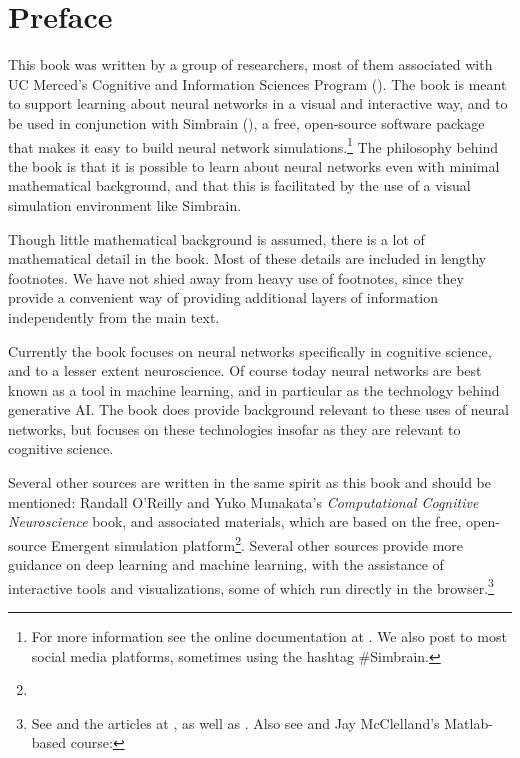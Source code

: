 \chapter*{Preface}\label{ch_preface}

This book was written by a group of researchers, most of them associated with UC Merced's Cognitive and Information Sciences Program (). The book is meant to support learning about neural networks in a visual and interactive way, and to be used in conjunction with Simbrain (), a free, open-source software package that makes it easy to build neural network simulations.\footnote{For more information see the online documentation at . We also post to most social media platforms, sometimes using the hashtag \#Simbrain.} The philosophy behind the book is that it is possible to learn about neural networks even with minimal mathematical background, and that this is facilitated by the use of a visual simulation environment like Simbrain.

Though little mathematical background is assumed, there is a lot of mathematical detail in the book. Most of these details are included in lengthy footnotes. We have not shied away from heavy use of footnotes, since they provide a convenient way of providing additional layers of information independently from the main text. 

Currently the book focuses on neural networks specifically in cognitive science, and to a lesser extent neuroscience. Of course today neural networks are best known as a tool in machine learning, and in particular as the technology behind generative AI. The book does provide background relevant to these uses of neural networks, but focuses on these technologies insofar as they are relevant to cognitive science.

Several other sources are written in the same spirit as this book and should be mentioned: Randall O'Reilly and Yuko Munakata's \emph{Computational Cognitive Neuroscience} book, and associated materials, which are based on the free, open-source Emergent simulation platform\footnote{}. Several other sources provide more guidance on deep learning and machine learning, with the assistance of interactive tools and visualizations, some of which run directly in the browser.\footnote{See  and the articles at , as well as . Also see   and Jay McClelland's Matlab-based course: }

